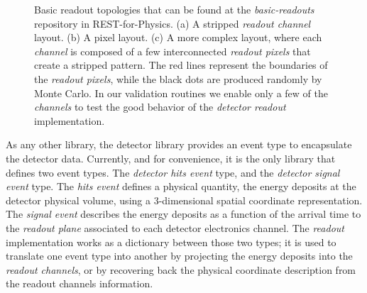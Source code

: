 \begin{figure}[htb!]
  \centering
	\caption{Basic readout topologies that can be found at the \emph{basic-readouts} repository in REST-for-Physics. (a) A stripped \emph{readout channel} layout. (b) A pixel layout. (c) A more complex layout, where each \emph{channel} is composed of a few interconnected \emph{readout pixels} that create a stripped pattern. The red lines represent the boundaries of the \emph{readout pixels}, while the black dots are produced randomly by Monte Carlo. In our validation routines we enable only a few of the \emph{channels} to test the good behavior of the \emph{detector readout} implementation.  }\label{fig:readouts}
\end{figure}

As any other library, the detector library provides an event type to encapsulate the detector data. Currently, and for convenience, it is the only library that defines two event types. The \emph{detector hits event} type, and the \emph{detector signal event} type. The \emph{hits event} defines a physical quantity, the energy deposits at the detector physical volume, using a 3-dimensional spatial coordinate representation. The \emph{signal event} describes the energy deposits as a function of the arrival time to the \emph{readout plane} associated to each detector electronics channel. The \emph{readout} implementation works as a dictionary between those two types; it is used to translate one event type into another by projecting the energy deposits into the \emph{readout channels}, or by recovering back the physical coordinate description from the readout channels information.


